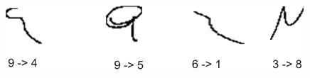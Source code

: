 \documentclass[10pt]{IEEEtran}
\begin{document}
 \begin{figure}
	\centering
		\includegraphics[scale=0.4]{conf2.jpg}
	\caption[Sample of the confused digits]{}
	\label{fig:conff}

\end{figure}

%
\end{document}
